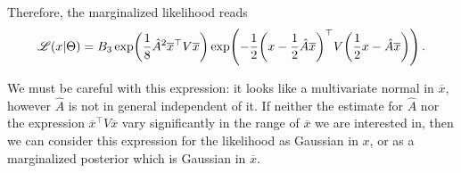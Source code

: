 \documentclass[main.tex]{subfiles}
\begin{document}
Therefore, the marginalized likelihood reads 
%
\begin{align}
\mathscr{L}(x | \Theta ) = B_3 \exp( \frac{1}{8} \hat{A}^2 \overline{x}^{\top} V \overline{x}) \exp(- \frac{1}{2} \qty(x - \frac{1}{2} \hat{A} \overline{x})^{\top} V \qty( \frac{1}{2} x - \hat{A} \overline{x}))
\,.
\end{align}

We must be careful with this expression: it looks like a multivariate normal in \(\overline{x}\), however \(\hat{A}\) is not in general independent of it.
If neither the estimate for \(\hat{A}\) nor the expression \(\overline{x}^{\top} V \overline{x}\) vary significantly in the range of \(\overline{x}\) we are interested in, then we can consider this expression for the likelihood as Gaussian in \(x\), or as a marginalized posterior which is Gaussian in \(\overline{x}\).

\end{document}
